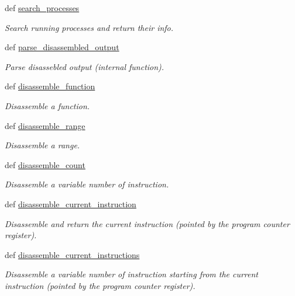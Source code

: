 \begin{DoxyCompactItemize}
def \hyperlink{namespacegdb__utils_acd7370f13df479c88d906e889b689da5}{search\_\-processes}
\begin{DoxyCompactList}\small\item\em Search running processes and return their info. \item\end{DoxyCompactList}\item 
def \hyperlink{namespacegdb__utils_a26847c0237df4c93c1a9730fff176ebb}{parse\_\-disassembled\_\-output}
\begin{DoxyCompactList}\small\item\em Parse disassebled output (internal function). \item\end{DoxyCompactList}\item 
def \hyperlink{namespacegdb__utils_a53631beb2f9fbc513f91f518c8a14909}{disassemble\_\-function}
\begin{DoxyCompactList}\small\item\em Disassemble a function. \item\end{DoxyCompactList}\item 
def \hyperlink{namespacegdb__utils_afef6275f9b3c7c8ade8b5d480bb8cfa8}{disassemble\_\-range}
\begin{DoxyCompactList}\small\item\em Disassemble a range. \item\end{DoxyCompactList}\item 
def \hyperlink{namespacegdb__utils_ab1c43cdcaef7773455846cde28072195}{disassemble\_\-count}
\begin{DoxyCompactList}\small\item\em Disassemble a variable number of instruction. \item\end{DoxyCompactList}\item 
def \hyperlink{namespacegdb__utils_a582cf34912aa2a254db0f09439217952}{disassemble\_\-current\_\-instruction}
\begin{DoxyCompactList}\small\item\em Disassemble and return the current instruction (pointed by the program counter register). \item\end{DoxyCompactList}\item 
def \hyperlink{namespacegdb__utils_a06ba6fed35ce3e4c302ddda2538dfee2}{disassemble\_\-current\_\-instructions}
\begin{DoxyCompactList}\small\item\em Disassemble a variable number of instruction starting from the current instruction (pointed by the program counter register). \item\end{DoxyCompactList}\item 

\end{DoxyCompactItemize}
